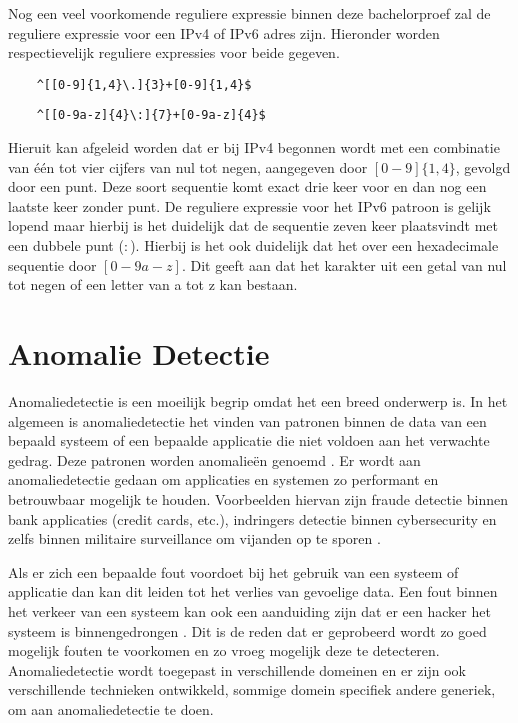 Nog een veel voorkomende reguliere expressie binnen deze bachelorproef zal de reguliere expressie voor een IPv4 of IPv6 adres zijn. Hieronder worden respectievelijk reguliere expressies voor beide gegeven.
\begin{verbatim}
    ^[[0-9]{1,4}\.]{3}+[0-9]{1,4}$
\end{verbatim}
\begin{verbatim}
    ^[[0-9a-z]{4}\:]{7}+[0-9a-z]{4}$
\end{verbatim}
Hieruit kan afgeleid worden dat er bij IPv4 begonnen wordt met een combinatie van één tot vier cijfers van nul tot negen, aangegeven door \([0-9]\{1,4\}\), gevolgd door een punt. Deze soort sequentie komt exact drie keer voor en dan nog een laatste keer zonder punt. De reguliere expressie voor het IPv6 patroon is gelijk lopend maar hierbij is het duidelijk dat de sequentie zeven keer plaatsvindt met een dubbele punt (\(:\)). Hierbij is het ook duidelijk dat het over een hexadecimale sequentie door \([0-9a-z]\). Dit geeft aan dat het karakter uit een getal van nul tot negen of een letter van a tot z kan bestaan.

\section{Anomalie Detectie}

Anomaliedetectie is een moeilijk begrip omdat het een breed onderwerp is. In het algemeen is anomaliedetectie het vinden van patronen binnen de data van een bepaald systeem of een bepaalde applicatie die niet voldoen aan het verwachte gedrag. Deze patronen worden anomalieën genoemd \autocite{chandola2009anomaly}. Er wordt aan anomaliedetectie gedaan om applicaties en systemen zo performant en betrouwbaar mogelijk te houden. Voorbeelden hiervan zijn fraude detectie binnen bank applicaties (credit cards, etc.), indringers detectie binnen cybersecurity en zelfs binnen militaire surveillance om vijanden op te sporen \autocite{chandola2009anomaly}. 

Als er zich een bepaalde fout voordoet bij het gebruik van een systeem of applicatie dan kan dit leiden tot het verlies van gevoelige data. Een fout binnen het verkeer van een systeem kan ook een aanduiding zijn dat er een hacker het systeem is binnengedrongen \autocite{chandola2009anomaly}. Dit is de reden dat er geprobeerd wordt zo goed mogelijk fouten te voorkomen en zo vroeg mogelijk deze te detecteren. Anomaliedetectie wordt toegepast in verschillende domeinen en er zijn ook verschillende technieken ontwikkeld, sommige domein specifiek andere generiek, om aan anomaliedetectie te doen. 

